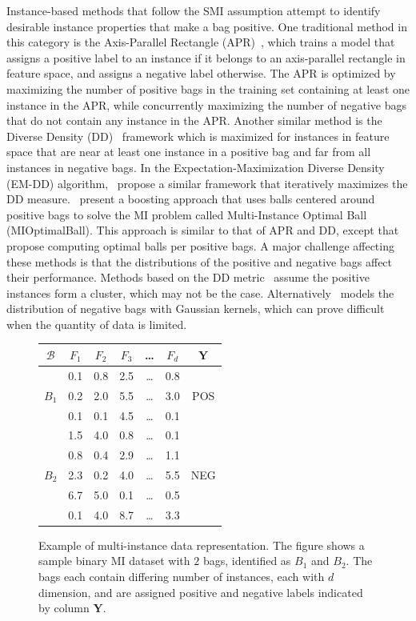 Instance-based methods that follow the SMI assumption attempt to identify desirable instance properties that make a bag positive. One traditional method in this category is the Axis-Parallel Rectangle (APR)~\citep{Dietterich1997}, which trains a model that assigns a positive label to an instance if it belongs to an axis-parallel rectangle in feature space, and assigns a negative label otherwise. The APR is optimized by maximizing the number of positive bags in the training set containing at least one instance in the APR, while concurrently maximizing the number of negative bags that do not contain any instance in the APR. Another similar method is the Diverse Density (DD)~\citep{Maron1998} framework which is maximized for instances in feature space that are near at least one instance in a positive bag and far from all instances in negative bags. In the Expectation-Maximization Diverse Density (EM-DD) algorithm,~\cite{Zhang2001} propose a similar framework that iteratively maximizes the DD measure.~\cite{Auer2004} present a boosting approach that uses balls centered around positive bags to solve the MI problem called Multi-Instance Optimal Ball (MIOptimalBall). This approach is similar to that of APR and DD, except that~\cite{Auer2004} propose computing optimal balls per positive bags. A major challenge affecting these methods is that the distributions of the positive and negative bags affect their performance. Methods based on the DD metric~\citep{Chen2004,Chen2006,Carbonneau2016,Zhang2001} assume the positive instances form a cluster, which may not be the case. Alternatively~\cite{Fu2011} models the distribution of negative bags with Gaussian kernels, which can prove difficult when the quantity of data is limited. 
\begin{figure}
\centering
\begin{tabular}{|c|ccccc|c|}
\hline
$\mathcal{B}$ & $F_1$ & $F_2$ & $F_3$ & \ldots & $F_d$ & $\bm Y$ \\        
\hline
    	  & 0.1 & 0.8 & 2.5 & \ldots & 0.8 &    \\        
    $B_1$ 	  & 0.2 & 2.0 & 5.5 & \ldots & 3.0 & POS \\
    	  & 0.1 & 0.1   & 4.5 & \ldots & 0.1 &    \\
\hline
    	  & 1.5 & 4.0 & 0.8 & \ldots & 0.1 &    \\
    	  & 0.8 & 0.4 & 2.9 & \ldots & 1.1 &    \\
    $B_2$	  & 2.3 & 0.2 & 4.0 & \ldots & 5.5 & NEG \\
    	  & 6.7 & 5.0 & 0.1  & \ldots & 0.5 &    \\
    	  & 0.1 & 4.0 & 8.7 & \ldots & 3.3 &    \\
\hline
  \end{tabular}
  \caption{Example of multi-instance data representation. The figure shows a sample binary MI dataset with $2$ bags, identified as $B_1$ and $B_2$. The bags each contain differing number of instances, each with $d$ dimension, and are assigned positive and negative labels indicated by column $\bm Y$.}%
  \label{fig:mirep}%
\end{figure}

